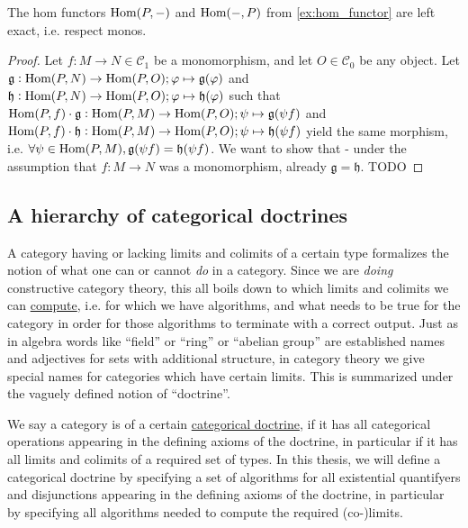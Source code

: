 \begin{lemma}\label{la:hom_functor_left_exact}
The hom functors $\textup{Hom}(P,-)$ and $\textup{Hom}(-,P)$ from \ref{ex:hom_functor} are left exact, i.e. respect monos.
\begin{proof}
Let $f : M \rightarrow N \in \mathcal{C}_{1}$ be a monomorphism, and let $O \in \mathcal{C}_{0}$ be any object.
Let $\mathfrak{g} : \textup{Hom}(P,N) \rightarrow \textup{Hom}(P,O); \varphi \mapsto \mathfrak{g}(\varphi)$
and $\mathfrak{h} : \textup{Hom}(P,N) \rightarrow \textup{Hom}(P,O); \varphi \mapsto \mathfrak{h}(\varphi)$
such that $\textup{Hom}(P,f) \cdot \mathfrak{g} : \textup{Hom}(P,M) \rightarrow \textup{Hom}(P,O); \psi \mapsto \mathfrak{g}(\psi f)$
and  $\textup{Hom}(P,f) \cdot \mathfrak{h} : \textup{Hom}(P,M) \rightarrow \textup{Hom}(P,O); \psi \mapsto \mathfrak{h}(\psi f)$
yield the same morphism, i.e. $\forall \psi \in \textup{Hom}(P,M), \mathfrak{g}(\psi f) = \mathfrak{h}(\psi f)$.
We want to show that - under the assumption that $f : M \rightarrow N$ was a monomorphism, already $\mathfrak{g} = \mathfrak{h}$.
TODO
\end{proof}
\end{lemma}

\subsection{A hierarchy of categorical doctrines}

A category having or lacking limits and colimits of a certain type formalizes the notion of what one can or cannot \textit{do} in a category.
Since we are \textit{doing} constructive category theory, this all boils down to which limits and colimits we can \ul{compute}, i.e. for which we
have algorithms, and what needs to be true for the category in order for those algorithms to terminate with a correct output.
Just as in algebra words like ``field'' or ``ring'' or ``abelian group'' are established names and adjectives for sets with additional structure,
in category theory we give special names for categories which have certain limits. This is summarized under the vaguely defined
notion of ``doctrine''.

We say a category is of a certain \ul{categorical doctrine}, if it has all categorical operations appearing in the
defining axioms of the doctrine, in particular if it has all limits and colimits of a required set of types.
In this thesis, we will define a categorical doctrine by specifying a set of algorithms for all existential quantifyers and
disjunctions appearing in the defining axioms of the doctrine, in particular by specifying all algorithms needed to
compute the required (co-)limits.

